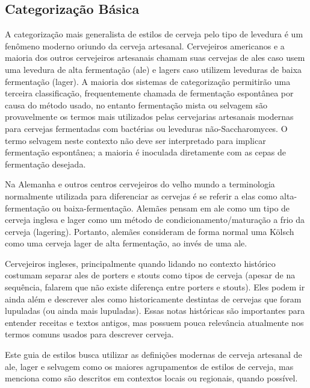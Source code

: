\subsection*{Categorização Básica}
A categorização mais generalista de estilos de cerveja pelo tipo de levedura é um fenômeno moderno oriundo da cerveja artesanal. Cervejeiros americanos e a maioria dos outros cervejeiros artesanais chamam suas cervejas de ales caso usem uma levedura de alta fermentação (ale) e lagers caso utilizem leveduras de baixa fermentação (lager). A maioria dos sistemas de categorização permitirão uma terceira classificação, frequentemente chamada de fermentação espontânea por causa do método usado, no entanto fermentação mista ou selvagem são provavelmente os termos mais utilizados pelas cervejarias artesanais modernas para cervejas fermentadas com bactérias ou leveduras não-Saccharomyces. O termo selvagem neste contexto não deve ser interpretado para implicar fermentação espontânea; a maioria é inoculada diretamente com as cepas de fermentação desejada.

Na Alemanha e outros centros cervejeiros do velho mundo a terminologia normalmente utilizada para diferenciar as cervejas é se referir a elas como alta-fermentação ou baixa-fermentação. Alemães pensam em ale como um tipo de cerveja inglesa e lager como um método de condicionamento/maturação a frio da cerveja (lagering). Portanto, alemães consideram de forma normal uma Kölsch como uma cerveja lager de alta fermentação, ao invés de uma ale.

Cervejeiros ingleses, principalmente quando lidando no contexto histórico costumam separar ales de porters e stouts como tipos de cerveja (apesar de na sequência, falarem que não existe diferença entre porters e stouts). Eles podem ir ainda além e descrever ales como historicamente destintas de cervejas que foram lupuladas (ou ainda mais lupuladas). Essas notas históricas são importantes para entender receitas e textos antigos, mas possuem pouca relevância atualmente nos termos comuns usados para descrever cerveja.

Este guia de estilos busca utilizar as definições modernas de cerveja artesanal de ale, lager e selvagem como os maiores agrupamentos de estilos de cerveja, mas menciona como são descritos em contextos locais ou regionais, quando possível.